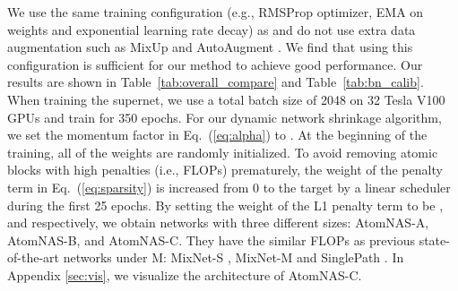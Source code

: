 \documentclass{article} \usepackage{iclr2020_conference,times}
\newcommand{\flops}{FLOPs\xspace}
\begin{document}
We use the same training configuration (e.g., RMSProp optimizer, EMA on weights and exponential learning rate decay) as \cite{tan2019mnasnet,stamoulis2019single_path} and do not use extra data augmentation such as MixUp \citep{zhang2018mixup} and AutoAugment \citep{cubuk2018autoaugment}. We find that using this configuration is sufficient for our method to achieve good performance. Our results are shown in Table~\ref{tab:overall_compare} and Table~\ref{tab:bn_calib}. When training the supernet, we use a total batch size of 2048 on 32 Tesla V100 GPUs and train for 350 epochs. For our dynamic network shrinkage algorithm, we set the momentum factor  in Eq.~(\ref{eq:alpha}) to . At the beginning of the training, all of the weights are randomly initialized. To avoid removing atomic blocks with high penalties (i.e., \flops) prematurely, the weight of the penalty term in Eq.~(\ref{eq:sparsity}) is increased from 0 to the target  by a linear scheduler during the first 25 epochs. By setting the weight of the L1 penalty term  to be ,  and  respectively, we obtain networks with three different sizes: AtomNAS-A, AtomNAS-B, and AtomNAS-C. They have the similar \flops as previous state-of-the-art networks under M: MixNet-S \citep{tan2019mixnet}, MixNet-M \citep{tan2019mixnet} and SinglePath \citep{stamoulis2019single_path}. In Appendix \ref{sec:vis}, we visualize the architecture of AtomNAS-C.
\end{document}
